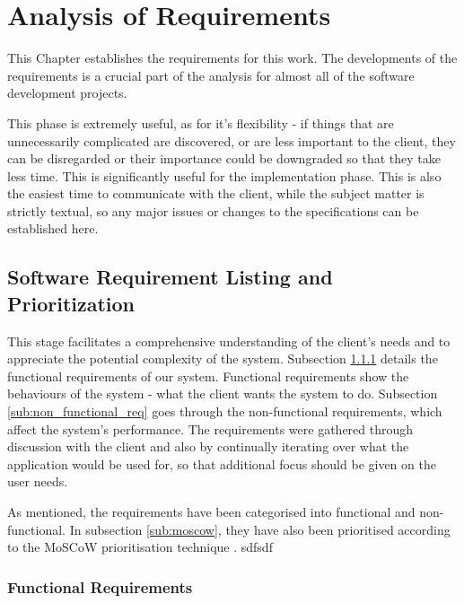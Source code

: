 \chapter{Analysis of Requirements}
\label{chapterlabel3}


This Chapter establishes the requirements for this work. The developments of the requirements is a crucial part of the analysis for almost all of the software development projects.

This phase is extremely useful, as for it's flexibility - if things that are unnecessarily complicated are discovered, or are less important to the client, they can be disregarded  or their importance could be downgraded so that they take less time. This is significantly useful for the implementation phase. This is also the easiest time to communicate with the client, while the subject matter is strictly textual, so any major issues or changes to the specifications can be established here.



\section{Software Requirement Listing and Prioritization}
\label{sec:softreqlistandprior} 

This stage facilitates a comprehensive understanding of the client's needs and to appreciate the potential complexity of the system. Subsection \ref{sub:functional_req} details the functional requirements of our system.  Functional requirements show the behaviours of the system - what the client wants the system to do.  Subsection \ref{sub:non_functional_req} goes through the non-functional requirements, which affect the system's performance. 
The requirements were gathered through discussion with the client and also by continually iterating over what the application would be used for, so that additional focus should be given on the user needs.


 As mentioned, the requirements have been categorised into functional and non-functional. In subsection \ref{sub:moscow}, they have also been prioritised according to the MoSCoW prioritisation technique \cite{cleggbarker1994}.
 sdfsdf


\subsection{Functional Requirements}
\label{sub:functional_req}

